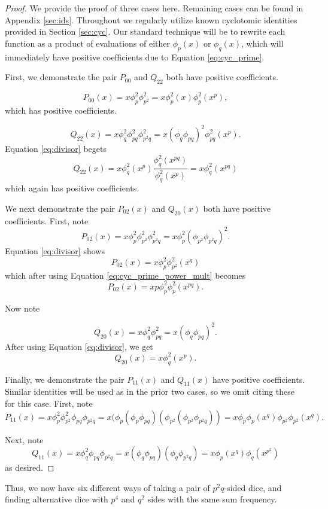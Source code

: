 \documentclass[11pt]{amsart}
\numberwithin{equation}{section}
\theoremstyle{plain}
\theoremstyle{definition}
\begin{document}
\begin{proof} 
We provide the proof of three cases here. Remaining cases can be found in Appendix \ref{sec:ids}. Throughout we regularly utilize known cyclotomic identities provided in Section \ref{sec:cyc}. Our standard technique will be to rewrite each function as a product of evaluations of either $\phi_p(x)$ or $\phi_q(x)$, which will immediately have positive coefficients due to Equation \eqref{eq:cyc_prime}.

First, we demonstrate the pair $P_{00}$ and $Q_{22}$ both have positive coefficients. 

$$P_{00}(x)=x{\phi}_{p}^2{\phi}_{p^2}^2=x\phi_{p}^2(x)\phi_{p}^2(x^p),$$
which has positive coefficients.

$$Q_{22}(x)=x\phi_q^2\phi_{pq}^2\phi_{p^2q}^2=x(\phi_q\phi_{pq})^2\phi_{pq}^2(x^p).$$
Equation \eqref{eq:divisor} 
begets
$$Q_{22}(x)=x\phi_q^2(x^p)\frac{\phi_{q}^2(x^{pq})}{\phi_q^2(x^p)}=x\phi_q^2(x^{pq})$$
which again has positive coefficients.

We next demonstrate the pair $P_{02}(x)$ and $Q_{20}(x)$ both have positive coefficients. First, note
$$P_{02}(x)=x\phi_p^2\phi_{p^2}^2\phi_{p^2q}^2=x\phi_{p}^2(\phi_{p^2}\phi_{p^2q})^2.$$
Equation \eqref{eq:divisor} shows
$$P_{02}(x)=x\phi_p^2\phi_{p^2}^2(x^q)$$
which after using Equation \eqref{eq:cyc_prime_power_mult} becomes
$$P_{02}(x)=xp\phi_p^2\phi_p^2(x^{pq}).$$

Now note

$$Q_{20}(x)=x\phi_q^2\phi_{pq}^2=x(\phi_q\phi_{pq})^2.$$
After using Equation \eqref{eq:divisor}, we get
$$Q_{20}(x)=x\phi_q^2(x^p).$$

Finally, we demonstrate the pair $P_{11}(x)$ and $Q_{11}(x)$ have positive coefficients. Similar identities will be used as in the prior two cases, so we omit citing these for this case. First, note
$$P_{11}(x)=x\phi_p^2\phi_{p^2}^2\phi_{pq}\phi_{p^2q}=x(\phi_p(\phi_p\phi_{pq})(\phi_{p^2}(\phi_{p^2}\phi_{p^2q}))=x\phi_p\phi_p(x^q)\phi_{p^2}\phi_{p^2}(x^q).$$

Next, note
$$Q_{11}(x)=x\phi_q^2\phi_{pq}\phi_{p^2q}=x(\phi_{q}\phi_{pq})(\phi_{q}\phi_{p^2q})=x\phi_{p}(x^q)\phi_{q}(x^{p^2})$$
as desired.
\end{proof}

Thus, we now have six different ways of taking a pair of $p^2q$-sided dice, and finding alternative dice with $p^4$ and $q^2$ sides with the same sum frequency.
\end{document}
